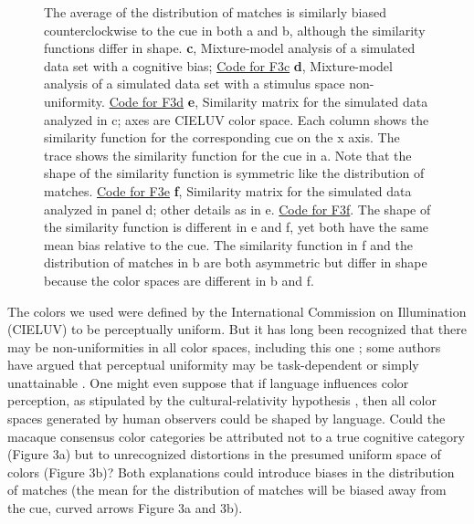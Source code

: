 \documentclass[9pt,biorxiv,lineno,onehalfspacing]{lapreprint}
\begin{document}
\begin{refsection}
\begin{figure}
\begin{fullwidth}
{    The average of the distribution of matches is similarly biased counterclockwise to the cue in both a and b, although the similarity functions differ in shape. \textbf{c}, Mixture-model analysis of a simulated data set with a cognitive bias; \href{https://github.com/NEI-LSR/MacaqueColorCategories/blob/main/Outputs/Paper/Figures/working/F3_TCCModel/Code/F3ace_TCCModel_OffsetGaussian.m}{Code for F3c} \textbf{d}, Mixture-model analysis of a simulated data set with a stimulus space non-uniformity. 
    \href{https://github.com/NEI-LSR/MacaqueColorCategories/blob/main/Outputs/Paper/Figures/working/F3_TCCModel/Code/F3bdf_TCCModel_StimulusSpaceNonUnifomity.m}{Code for F3d}
    \textbf{e}, Similarity matrix for the simulated data analyzed in c; axes are CIELUV color space. 
    Each column shows the similarity function for the corresponding cue on the x axis. 
    The trace shows the similarity function for the cue in a. 
    Note that the shape of the similarity function is symmetric like the distribution of matches. \href{https://github.com/NEI-LSR/MacaqueColorCategories/blob/main/Outputs/Paper/Figures/working/F3_TCCModel/Code/F3ace_TCCModel_OffsetGaussian.m}{Code for F3e} \textbf{f}, Similarity matrix for the simulated data analyzed in panel d; other details as in e. 
    \href{https://github.com/NEI-LSR/MacaqueColorCategories/blob/main/Outputs/Paper/Figures/working/F3_TCCModel/Code/F3bdf_TCCModel_StimulusSpaceNonUnifomity.m}{Code for F3f}. The shape of the similarity function is different in e and f, yet both have the same mean bias relative to the cue. 
    The similarity function in f and the distribution of matches in b are both asymmetric but differ in shape because the color spaces are different in b and f.}
    \label{fig:TCCDemo}
    \end{fullwidth}
\end{figure}

The colors we used were defined by the International Commission on Illumination (CIELUV) to be perceptually uniform. 
But it has long been recognized that there may be non-uniformities in all color spaces, including this one \citep{stockman_colorimetry_2010}; some authors have argued that perceptual uniformity may be task-dependent or simply unattainable \citep{judd_ideal_1970}. 
One might even suppose that if language influences color perception, as stipulated by the cultural-relativity hypothesis \citep{roberson_color_2005}, then all color spaces generated by human observers could be shaped by language. 
Could the macaque consensus color categories be attributed not to a true cognitive category (Figure 3a) but to unrecognized distortions in the presumed uniform space of colors (Figure 3b)? 
Both explanations could introduce biases in the distribution of matches (the mean for the distribution of matches will be biased away from the cue, curved arrows Figure 3a and 3b).


\end{refsection}
\end{document}
